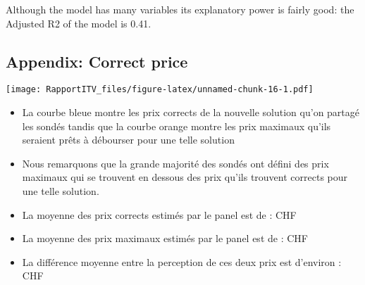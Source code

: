\documentclass[
]{article}
\begin{document}
Although the model has many variables its explanatory power is fairly
good: the Adjusted R2 of the model is 0.41.

\newpage

\hypertarget{appendix-correct-price}{%
\subsection{Appendix: Correct price}\label{appendix-correct-price}}

\texttt{[image: RapportITV\_files/figure-latex/unnamed-chunk-16-1.pdf]}

\begin{itemize}
\item
  La courbe bleue montre les prix corrects de la nouvelle solution qu'on
  partagé les sondés tandis que la courbe orange montre les prix
  maximaux qu'ils seraient prêts à débourser pour une telle solution
\item
  Nous remarquons que la grande majorité des sondés ont défini des prix
  maximaux qui se trouvent en dessous des prix qu'ils trouvent corrects
  pour une telle solution.
\item
  La moyenne des prix corrects estimés par le panel est de : CHF
\item
  La moyenne des prix maximaux estimés par le panel est de : CHF
\item
  La différence moyenne entre la perception de ces deux prix est
  d'environ : CHF
\end{itemize}
\end{document}
